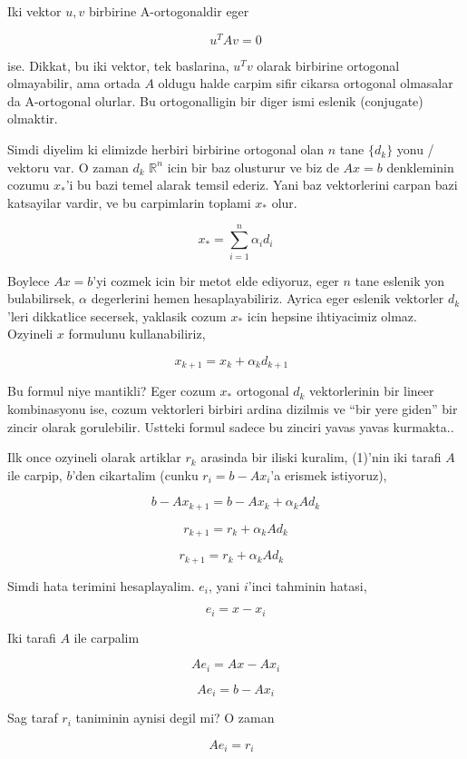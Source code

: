 \documentclass[12pt,fleqn]{article}\usepackage{../common}
\begin{document}
Iki vektor $u,v$ birbirine A-ortogonaldir eger

\[ u^TAv = 0 \] 

ise. Dikkat, bu iki vektor, tek baslarina, $u^Tv$ olarak birbirine
ortogonal olmayabilir, ama ortada $A$ oldugu halde carpim sifir cikarsa
ortogonal olmasalar da A-ortogonal olurlar. Bu ortogonalligin bir diger
ismi eslenik (conjugate) olmaktir.

Simdi diyelim ki elimizde herbiri birbirine ortogonal olan $n$ tane
$\{d_k\}$ yonu / vektoru var. O zaman $d_k$ $\mathbb{R}^n$ icin bir baz
olusturur ve biz de $Ax = b$ denkleminin cozumu $x_*$'i bu bazi temel
alarak temsil ederiz. Yani baz vektorlerini carpan bazi katsayilar vardir,
ve bu carpimlarin toplami $x_*$ olur. 

\[ x_* = \sum _{ i=1}^{n} \alpha_i d_i \]

Boylece $Ax = b$'yi cozmek icin bir metot elde ediyoruz, eger $n$ tane
eslenik yon bulabilirsek, $\alpha$ degerlerini hemen hesaplayabiliriz.
Ayrica eger eslenik vektorler $d_k$'leri dikkatlice secersek, yaklasik cozum $x_*$
icin hepsine ihtiyacimiz olmaz. Ozyineli $x$ formulunu kullanabiliriz,

\[ x_{k+1} = x_k + \alpha_k d_{k+1} \ \ \ \label{1} \]

Bu formul niye mantikli? Eger cozum $x_*$ ortogonal $d_k$ vektorlerinin bir
lineer kombinasyonu ise, cozum vektorleri birbiri ardina dizilmis ve ``bir
yere giden'' bir zincir olarak gorulebilir. Ustteki formul sadece bu
zinciri yavas yavas kurmakta..

Ilk once ozyineli olarak artiklar $r_k$ arasinda bir iliski kuralim,
(1)'nin iki tarafi $A$ ile carpip, $b$'den cikartalim (cunku
$r_i = b -
Ax_i$'a erismek istiyoruz),

\[b - A x_{k+1} = b - A x_k  + \alpha_k A d_{k} \]

\[r_{k+1} = r_k + \alpha_k A d_{k} \]

\[r_{k+1} = r_k + \alpha_k A d_{k} 
\ \ \ \label{8}
\]

Simdi hata terimini hesaplayalim. $e_i$, yani $i$'inci tahminin hatasi, 

\[ e_i = x - x_i  \]

Iki tarafi $A$ ile carpalim

\[ Ae_i = Ax - Ax_i  \]

\[ Ae_i = b - Ax_i  \]

Sag taraf $r_i$ taniminin aynisi degil mi? O zaman 

\[ Ae_i = r_i 
\ \ \ \label{5}
\]
\end{document}
